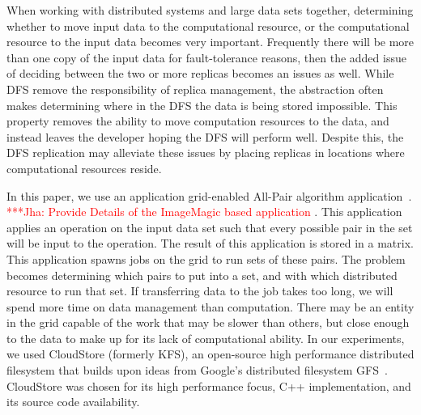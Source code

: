 \documentclass[a4paper,11pt]{article}
\newcommand{\jhanote}[1]{ {\textcolor{red} { ***Jha: #1 }}}
\newcommand{\jhanote}[1]{}
\begin{document}
When working with distributed systems and large data sets together, determining whether to move input data to the computational resource, or the computational resource to the input data becomes very important. Frequently there will be more than one copy of the input data for fault-tolerance reasons, then the added issue of deciding between the two or more replicas becomes an issues as well. While DFS remove the responsibility of replica management, the abstraction often makes determining where in the DFS the data is being stored impossible. This property removes the ability to move computation resources to the data, and instead leaves the developer hoping the DFS will perform well. Despite this, the DFS replication may alleviate these issues by placing replicas in locations where computational resources reside.


In this paper, we use an application grid-enabled All-Pair algorithm application~\cite{Interop}.  \jhanote{Provide Details of the ImageMagic based application}. This application applies an operation on the input data set such that every possible pair in the set will be input to the operation. The result of this application is stored in a matrix. This application spawns jobs on the grid to run sets of these pairs. The problem becomes determining which pairs to put into a set, and with which distributed resource to run that set. If transferring data to the job takes too long, we will spend more time on data management than computation. There may be an entity in the grid capable of the work that may be slower than others, but close enough to the data to make up for its lack of computational ability. In our experiments, we used CloudStore (formerly KFS), an open-source high performance distributed filesystem that builds upon ideas from Google's distributed filesystem GFS~\cite{kfs_web}. CloudStore was chosen for its high performance focus, C++ implementation, and its source code availability.
\end{document}
